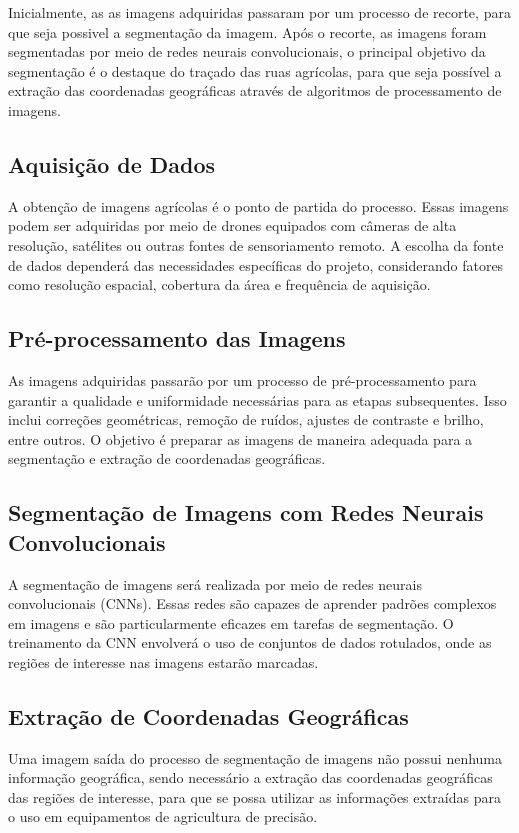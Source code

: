 \documentclass[conference]{IEEEtran}
\begin{document}
Inicialmente, as as imagens adquiridas passaram por um processo de recorte, para que seja possivel 
a segmentação da imagem. Após o recorte, as imagens foram segmentadas por meio de redes neurais
convolucionais, o principal objetivo da segmentação é o destaque do traçado das ruas agrícolas, 
para que seja possível a extração das coordenadas geográficas através de algoritmos de processamento
de imagens.

\subsection{Aquisição de Dados}

A obtenção de imagens agrícolas é o ponto de partida do processo. 
Essas imagens podem ser adquiridas por meio de drones equipados com câmeras de alta resolução, 
satélites ou outras fontes de sensoriamento remoto. A escolha da fonte de dados dependerá das 
necessidades específicas do projeto, considerando fatores como resolução espacial, 
cobertura da área e frequência de aquisição.

\subsection{Pré-processamento das Imagens}
As imagens adquiridas passarão por um processo de pré-processamento para garantir a qualidade 
e uniformidade necessárias para as etapas subsequentes. Isso inclui correções geométricas, 
remoção de ruídos, ajustes de contraste e brilho, entre outros. O objetivo é preparar as 
imagens de maneira adequada para a segmentação e extração de coordenadas geográficas.

\subsection{Segmentação de Imagens com Redes Neurais Convolucionais}
A segmentação de imagens será realizada por meio de redes neurais convolucionais (CNNs). 
Essas redes são capazes de aprender padrões complexos em imagens e são particularmente eficazes 
em tarefas de segmentação. O treinamento da CNN envolverá o uso de conjuntos de dados rotulados, 
onde as regiões de interesse nas imagens estarão marcadas.

\subsection{Extração de Coordenadas Geográficas}
Uma imagem saída do processo de segmentação de imagens não possui nenhuma informação geográfica, 
sendo necessário a extração das coordenadas geográficas das regiões de interesse, para que se possa 
utilizar as informações extraídas para o uso em equipamentos de agricultura de precisão.
\end{document}
